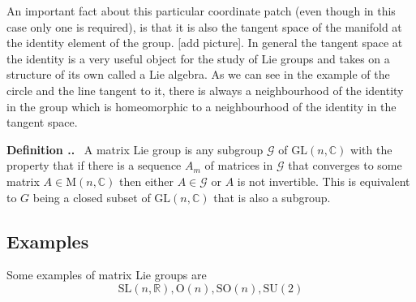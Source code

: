 \documentclass[honours]{UNSWthesis}
\newcommand{\R}{\mathbb{R}}
\newcommand{\C}{\mathbb{C}}
\newcommand{\G}{\mathcal{G}}
\newcommand{\1}{\mathbf{e}_{1}}
\newcommand{\2}{\mathbf{e}_{3}}
\newcommand{\3}{\mathbf{e}_{3}}
\newcounter{Item}[section]
\newenvironment{Definition}{\medskip
                            \refstepcounter{Item}
                            \noindent
                           {\bf Definition \thesection.\theItem.}\ }
                           {\medskip}
\begin{document}
An important fact about this particular coordinate patch (even though in this case only one is required), is that it is 
also the tangent space of the manifold at the identity element of the group. [add picture]. In general the tangent space at the identity is a
very useful object for the study of Lie groups and takes on a structure of its own called a Lie algebra. As we can see in the example of the circle and the line tangent to it, there is always a neighbourhood of the identity in the group which is homeomorphic to a neighbourhood of the identity in the tangent space.



\begin{Definition}\label{Matrix Lie Group}
A matrix Lie group is any subgroup $\G$ of $\mathrm{GL}(n,\C)$ with the property that if there is a sequence $A_{m}$ of
matrices in $\G$ that converges to some matrix $A \in \mathrm{M}(n,\C)$ then either $A \in \G $ or $A$ is not invertible.
This is equivalent to $G$ being a closed subset of $\mathrm{GL}(n,\C)$ that is also a subgroup.
\end{Definition}

\subsection*{Examples}
Some examples of matrix Lie groups are
\[\mathrm{SL}(n,\R), \mathrm{O}(n), \mathrm{SO}(n), \mathrm{SU}(2) \]
\end{document}
